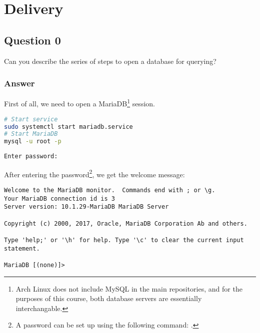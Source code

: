 \setcounter{section}{1}
\setcounter{page}{1}
\section{Delivery} %

\subsection*{Question 0}
Can you describe the series of steps to open a database for querying?

\subsubsection*{Answer}
First of all, we need to open a MariaDB\footnote{Arch Linux does not include MySQL in the main repositories, and for the purposes of this course, both database servers are essentially interchangable.} session.

\begin{lstlisting}[language=bash]
# Start service
sudo systemctl start mariadb.service
# Start MariaDB
mysql -u root -p
\end{lstlisting}

\begin{lstlisting}[style=output]
Enter password:
\end{lstlisting}

After entering the password\footnote{A password can be set up using the following command: .}, we get the welcome message:

\begin{lstlisting}[style=output]
Welcome to the MariaDB monitor.  Commands end with ; or \g.
Your MariaDB connection id is 3
Server version: 10.1.29-MariaDB MariaDB Server

Copyright (c) 2000, 2017, Oracle, MariaDB Corporation Ab and others.

Type 'help;' or '\h' for help. Type '\c' to clear the current input statement.

MariaDB [(none)]>
\end{lstlisting}

